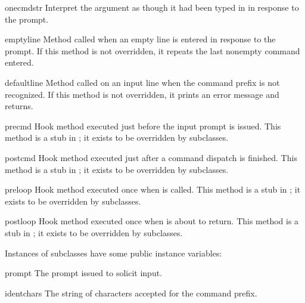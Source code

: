 \begin{methoddesc}{onecmd}{str}
Interpret the argument as though it had been typed in in
response to the prompt.
\end{methoddesc}

\begin{methoddesc}{emptyline}{}
Method called when an empty line is entered in response to the prompt.
If this method is not overridden, it repeats the last nonempty command
entered.  
\end{methoddesc}

\begin{methoddesc}{default}{line}
Method called on an input line when the command prefix is not
recognized. If this method is not overridden, it prints an
error message and returns.
\end{methoddesc}

\begin{methoddesc}{precmd}{}
Hook method executed just before the input prompt is issued.  This
method is a stub in ; it exists to be overridden by
subclasses.
\end{methoddesc}

\begin{methoddesc}{postcmd}{}
Hook method executed just after a command dispatch is finished.  This
method is a stub in ; it exists to be overridden by
subclasses.
\end{methoddesc}

\begin{methoddesc}{preloop}{}
Hook method executed once when  is called.  This
method is a stub in ; it exists to be overridden by
subclasses.
\end{methoddesc}

\begin{methoddesc}{postloop}{}
Hook method executed once when  is about to return.
This method is a stub in ; it exists to be overridden by
subclasses.
\end{methoddesc}

Instances of  subclasses have some public instance variables:

\begin{memberdesc}{prompt}
The prompt issued to solicit input.
\end{memberdesc}

\begin{memberdesc}{identchars}
The string of characters accepted for the command prefix.
\end{memberdesc}

